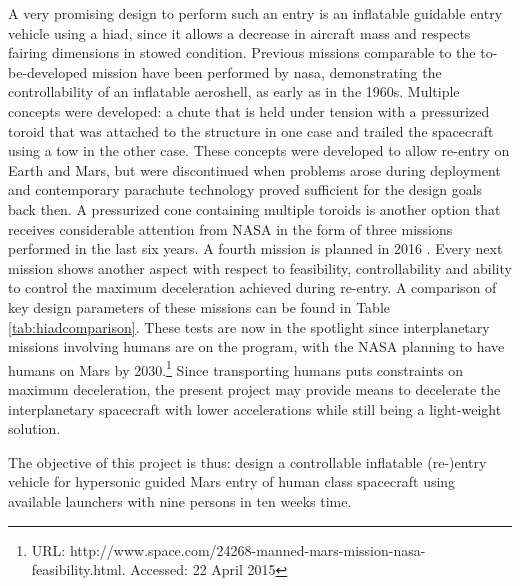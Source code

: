 A very promising design to perform such an entry is an inflatable guidable entry vehicle using a \gls{hiad}, since it allows a decrease in aircraft mass and respects fairing dimensions in stowed condition. Previous missions comparable to the to-be-developed mission have been performed by \gls{nasa}, demonstrating the controllability of an inflatable aeroshell, as early as in the 1960s. Multiple concepts were developed: a chute that is held under tension with a pressurized toroid that was attached to the structure in one case and trailed the spacecraft using a tow in the other case. These concepts were developed to allow re-entry on Earth and Mars, but were discontinued when problems arose during deployment and contemporary parachute technology proved sufficient for the design goals back then. \citep{hiadhistory}
A pressurized cone containing multiple toroids is another option that receives considerable attention from NASA in the form of three missions performed in the last six years. A fourth mission is planned in 2016 \cite{irve2,irve3,thor}. Every next mission shows another aspect with respect to feasibility, controllability and ability to control the maximum deceleration achieved during re-entry. A comparison of key design parameters of these missions can be found in Table \ref{tab:hiadcomparison}.
These tests are now in the spotlight since interplanetary missions involving humans are on the program, with the NASA planning to have humans on Mars by 2030.\footnote{URL: http://www.space.com/24268-manned-mars-mission-nasa-feasibility.html. Accessed: 22 April 2015} Since transporting humans puts constraints on maximum deceleration, the present project may provide means to decelerate the interplanetary spacecraft with lower accelerations while still being a light-weight solution.

The objective of this project is thus: design a controllable inflatable (re-)entry vehicle for hypersonic guided Mars entry of human class spacecraft using available launchers with nine persons in ten weeks time.

